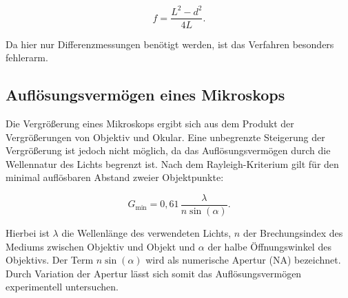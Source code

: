 \begin{equation}
    f = \frac{L^2 - d^2}{4L}.
    \label{eq:bessel}
\end{equation}

Da hier nur Differenzmessungen benötigt werden, ist das Verfahren besonders fehlerarm.

\subsection*{Auflösungsvermögen eines Mikroskops}

Die Vergrößerung eines Mikroskops ergibt sich aus dem Produkt der Vergrößerungen von Objektiv und Okular. Eine unbegrenzte Steigerung der Vergrößerung ist jedoch nicht möglich, da das Auflösungsvermögen durch die Wellennatur des Lichts begrenzt ist. Nach dem Rayleigh-Kriterium gilt für den minimal auflösbaren Abstand zweier Objektpunkte:

\begin{equation}
    G_{\text{min}} = 0{,}61 \, \frac{\lambda}{n \sin(\alpha)}.
    \label{eq:auflösung}
\end{equation}

Hierbei ist $\lambda$ die Wellenlänge des verwendeten Lichts, $n$ der Brechungsindex des Mediums zwischen Objektiv und Objekt und $\alpha$ der halbe Öffnungswinkel des Objektivs. Der Term $n \sin(\alpha)$ wird als numerische Apertur (NA) bezeichnet. Durch Variation der Apertur lässt sich somit das Auflösungsvermögen experimentell untersuchen.

